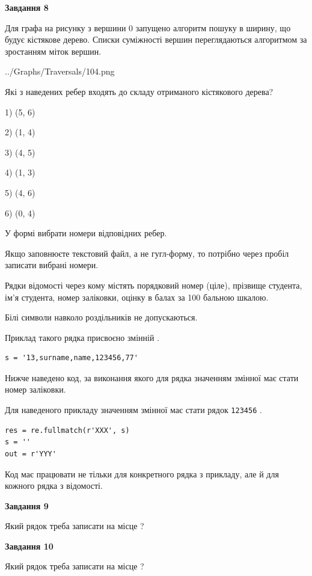 \documentclass[12pt, ukrainian]{article}
\def\code#1{\Verb!#1!}
\begin{document}
{\begin {large}
{\begin {center}\textbf{Завдання 8}\end {center}}\par
Для графа на рисунку з вершини 0 запущено алгоритм пошуку в ширину, що будує кістякове дерево. Списки суміжності вершин переглядаються алгоритмом за зростанням міток вершин.\par
\begin{center}
	{../Graphs/Traversals/104.png}
\end{center}
\par Які з наведених ребер входять до складу отриманого кістякового дерева?\par
1) (5, 6)\par
2) (1, 4)\par
3) (4, 5)\par
4) (1, 3)\par
5) (4, 6)\par
6) (0, 4)\par
{\vskip 15pt} У формі вибрати номери відповідних ребер.


Якщо заповнюєте текстовий файл, а не гугл-форму, то потрібно через пробіл записа\-ти вибрані номери.\par
\newpage


Рядки відомості через кому містять порядковий номер (ціле), пріз\-ви\-ще студен\-та, ім'я студента, номер заліковки, оцінку в балах за 100 бальною шкалою.

Білі символи навколо роздільників не допускаються.

Приклад такого рядка присвоєно змінній .



\begin{verbatim}
s = '13,surname,name,123456,77'
\end{verbatim}


Нижче наведено код, за виконання якого для рядка  значенням змінної  має стати номер заліковки.

Для наведеного прикладу значенням змінної  має стати рядок \code{123456} .



\begin{verbatim}
res = re.fullmatch(r'XXX', s)
s = ''
out = r'YYY'
\end{verbatim}


Код має працювати не тільки для конкретного рядка з прикладу, але й для кожного рядка з відомості.

{\begin {center}\textbf{Завдання 9}\end {center}}\par
Який рядок треба записати на місце  ?\par
\vspace{5mm}


{\begin {center}\textbf{Завдання 10}\end {center}}\par
Який рядок треба записати на місце  ?\par


\newpage


\end {large}}
\end{document}
